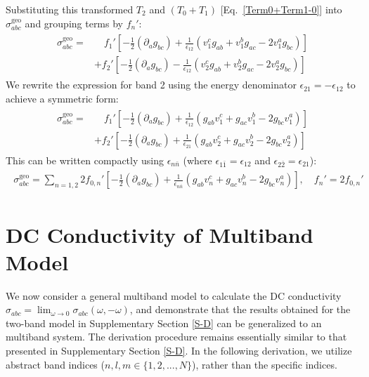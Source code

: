 \documentclass[twocolumn, prx, reprint, amsfonts, amsmath, amssymb, longbibliography, floatfix, aps]{revtex4-2}
\begin{document}
Substituting this transformed $T_2$ and $(T_0+T_1)$ [Eq.~\eqref{Term0+Term1-0}] into $\sigma_{abc}^{\text{geo}}$ and grouping terms by $f_n'$:
\begin{align}
\begin{aligned}
\sigma_{abc}^{\text{geo}} = & \quad f_1' \left[ -\frac{1}{2} (\partial_a g_{bc}) + \frac{1}{\epsilon_{12}} (v_1^c g_{ab} + v_1^b g_{ac} - 2v_1^a g_{bc}) \right] \\
& + f_2' \left[ -\frac{1}{2} (\partial_a g_{bc}) - \frac{1}{\epsilon_{12}} (v_2^c g_{ab} + v_2^b g_{ac} - 2v_2^a g_{bc}) \right]
\end{aligned}
\end{align}
We rewrite the expression for band 2 using the energy denominator $\epsilon_{21} = -\epsilon_{12}$ to achieve a symmetric form:
\begin{align}
\begin{aligned}
\sigma_{abc}^{\text{geo}} = & \quad f_1' \left[ -\frac{1}{2} (\partial_a g_{bc}) + \frac{1}{\epsilon_{12}} (g_{ab} v_1^c + g_{ac} v_1^b - 2 g_{bc} v_1^a) \right] \\
& + f_2' \left[ -\frac{1}{2} (\partial_a g_{bc}) + \frac{1}{\epsilon_{21}} (g_{ab} v_2^c + g_{ac} v_2^b - 2 g_{bc} v_2^a) \right]
\end{aligned}
\end{align}
This can be written compactly using $\epsilon_{n\bar{n}}$ (where $\epsilon_{1\bar{1}}=\epsilon_{12}$ and $\epsilon_{2\bar{2}}=\epsilon_{21}$):
\begin{align}
\label{Two-band Geometric}
\begin{aligned}
\sigma_{abc}^{\text{geo}} = \sum_{n=1,2} 
2 f_{0,n}'\left[ -\frac{1}{2} (\partial_a g_{bc}) + \frac{1}{\epsilon_{n\bar{n}}} (g_{ab} v_n^c + g_{ac} v_n^b - 2 g_{bc} v_n^a) \right],
\quad
f_n' = 2 f_{0,n}'
\end{aligned}
\end{align}



\newpage



\section{DC Conductivity of  Multiband Model}
\label{S-E}
We now consider a general multiband model to calculate the DC conductivity $\sigma_{abc} = \lim_{\omega \rightarrow 0}\sigma_{abc}(\omega, -\omega)$, and demonstrate that the results obtained for the two-band model in Supplementary Section \ref{S-D} can be generalized to an multiband system. The derivation procedure remains essentially similar to that presented in Supplementary Section \ref{S-D}. In the following derivation, we utilize abstract band indices ($n, l, m \in \{1, 2, ..., N\}$), rather than the specific indices.
\end{document}
